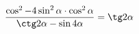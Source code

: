 \begin{ex}[type=prove_identity]
	\begin{condition}
		\(\dfrac{\cos^2-4\sin^2\alpha\cdot\cos^2\alpha}{\ctg2\alpha-\sin4\alpha}=\tg2\alpha \)
	\end{condition}
\end{ex}